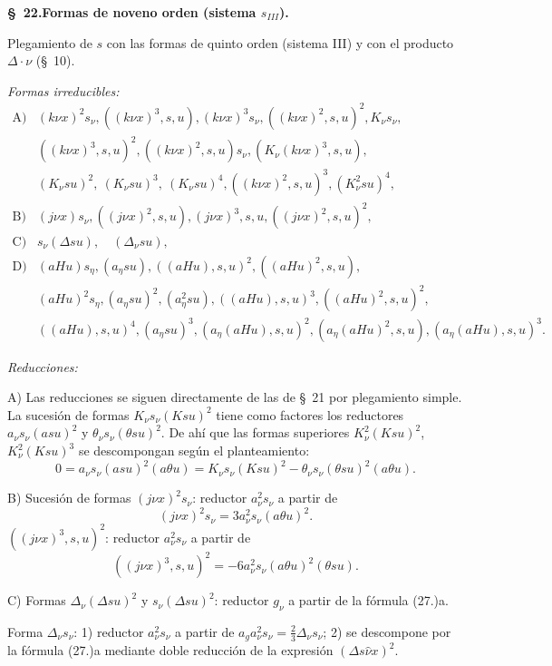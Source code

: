 \documentclass[11pt]{article}
\newcommand{\A}{\Delta}
\begin{document}
\begin{center}
\textbf{\S\ 22.\quad Formas de noveno orden (sistema $s_{III}$).}
\end{center}

Plegamiento de $s$ con las formas de quinto orden (sistema III) y con el producto $\A\cdot\nu$ (\S\ 10).

\noindent\emph{Formas irreducibles:}
\[
\begin{array}{ll}
\text{A)}& (k\nu x)^2s_\nu,
((k\nu x)^3,s,u),
(k\nu x)^3s_\nu,
((k\nu x)^2,s,u)^2,
K_\nu s_\nu,\\
& ((k\nu x)^3,s,u)^2,
((k\nu x)^2,s,u)s_\nu,
(K_\nu(k\nu x)^3,s,u),\\
& (K_\nu su)^2,\ (K_\nu su)^3,\ (K_\nu su)^4,
((k\nu x)^2,s,u)^3,
(K_\nu^2su)^4,\\[0.3em]
\text{B)}& (j\nu x)s_\nu,
((j\nu x)^2,s,u),
(j\nu x)^3,s,u,
((j\nu x)^2,s,u)^2,\\[0.3em]
\text{C)}& s_\nu(\A su),\quad (\A_\nu su),\\[0.3em]
\text{D)}& (aHu)s_\eta,
(a_\eta su),
((aHu),s,u)^2,
((aHu)^2,s,u),\\
& (aHu)^2s_\eta,
(a_\eta su)^2,
(a_\eta^2su),
((aHu),s,u)^3,
((aHu)^2,s,u)^2,\\
& ((aHu),s,u)^4,
(a_\eta su)^3,
(a_\eta(aHu),s,u)^2,
(a_\eta(aHu)^2,s,u),
(a_\eta(aHu),s,u)^3.
\end{array}
\]

\noindent\emph{Reducciones:}

A) Las reducciones se siguen directamente de las de \S\ 21 por plegamiento simple. La sucesión de formas $K_\nu s_\nu(Ksu)^2$ tiene como factores los reductores $a_\nu s_\nu(asu)^2$ y $\theta_\nu s_\nu(\theta su)^2$. De ahí que las formas superiores $K_\nu^2(Ksu)^2$, $K_\nu^2(Ksu)^3$ se descompongan según el planteamiento:
\[
0=a_\nu s_\nu(asu)^2(a\theta u)=K_\nu s_\nu(Ksu)^2-\theta_\nu s_\nu(\theta su)^2(a\theta u).
\]

B) Sucesión de formas $(j\nu x)^2s_\nu$: reductor $a_\nu^2s_\nu$ a partir de
\[
(j\nu x)^2s_\nu=3a_\nu^2s_\nu(a\theta u)^2.
\]
$((j\nu x)^3,s,u)^2$: reductor $a_\nu^2s_\nu$ a partir de
\[
((j\nu x)^3,s,u)^2=-6a_\nu^2s_\nu(a\theta u)^2(\theta su).
\]

C) Formas $\A_\nu(\A su)^2$ y $s_\nu(\A su)^2$: reductor $g_\nu$ a partir de la fórmula (27.)a.

Forma $\A_\nu s_\nu$:
1) reductor $a_\nu^2s_\nu$ a partir de $a_g a_\nu^2s_\nu=\frac23\A_\nu s_\nu$;
2) se descompone por la fórmula (27.)a mediante doble reducción de la expresión $(\A s\widehat\nu x)^2$.
\end{document}

